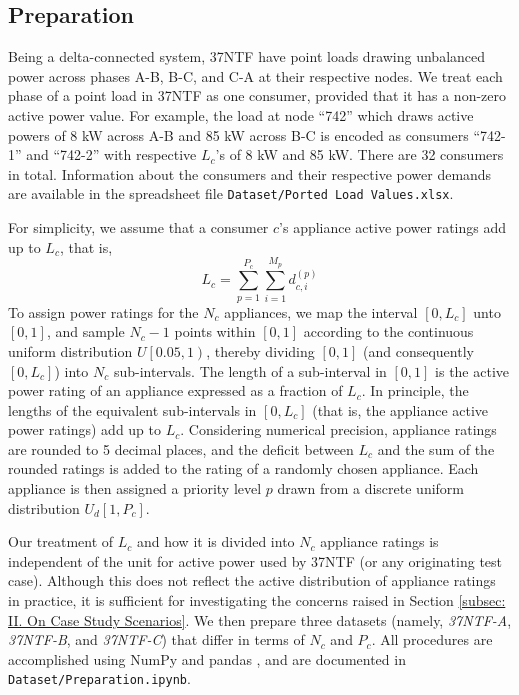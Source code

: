 \documentclass[journal, a4paper]{IEEEtran}
\begin{document}
\subsection{Preparation}
\label{subsec: III. Preparation}

Being a delta-connected system, 37NTF have point loads drawing unbalanced power across phases A-B, B-C, and C-A at their respective nodes.
We treat each phase of a point load in 37NTF as one consumer, provided that it has a non-zero active power value.
For example, the load at node ``742'' which draws active powers of 8 kW across A-B and 85 kW across B-C
is encoded as consumers ``742-1'' and ``742-2'' with respective $L_{c}$'s of 8 kW and 85 kW.
There are 32 consumers in total.
Information about the consumers and their respective power demands are available in the spreadsheet file
\texttt{Dataset/Ported Load Values.xlsx}.

For simplicity, we assume that a consumer $c$'s appliance active power ratings add up to $L_c$, that is,
\begin{equation*}
	L_{c} = \sum_{p=1}^{P_{c}} \sum_{i=1}^{M_{p}} d_{c,i}^{\left(p\right)}
\end{equation*}
To assign power ratings for the $N_{c}$ appliances, we map the interval $\left[0, L_{c}\right]$ unto $\left[0, 1\right]$,
and sample $N_{c} - 1$ points within $\left[0, 1\right]$
according to the continuous uniform distribution $U \left[0.05, 1\right)$,
thereby dividing $\left[0, 1\right]$ (and consequently $\left[0, L_{c}\right]$) into $N_{c}$ sub-intervals.
The length of a sub-interval in $\left[0, 1\right]$ is the active power rating of an appliance
expressed as a fraction of $L_{c}$.
In principle, the lengths of the equivalent sub-intervals in $\left[0, L_{c}\right]$
(that is, the appliance active power ratings) add up to $L_{c}$.
Considering numerical precision, appliance ratings are rounded to 5 decimal places,
and the deficit between $L_{c}$ and the sum of the rounded ratings is added to the rating of a randomly chosen appliance.
Each appliance is then assigned a priority level $p$ drawn from a discrete uniform distribution
$U_{d} \left[1, P_{c}\right]$.

Our treatment of $L_{c}$ and how it is divided into $N_{c}$ appliance ratings is
independent of the unit for active power used by 37NTF (or any originating test case).
Although this does not reflect the active distribution of appliance ratings in practice,
it is sufficient for investigating the concerns raised in Section \ref{subsec: II. On Case Study Scenarios}.
We then prepare three datasets (namely, \textit{37NTF-A}, \textit{37NTF-B}, and \textit{37NTF-C})
that differ in terms of $N_{c}$ and $P_{c}$.
All procedures are accomplished using NumPy \cite{NumPy2020}
and pandas \cite{Pandas2010,Pandas2020},
and are documented in \texttt{Dataset/Preparation.ipynb}.
\end{document}
